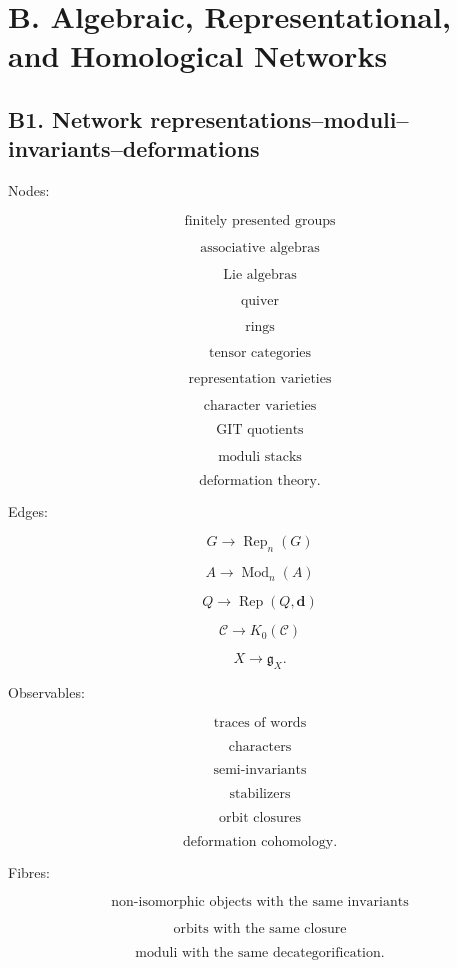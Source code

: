 \documentclass[11pt]{article}
\begin{document}
\section{B. Algebraic, Representational, and Homological Networks}



\subsection{B1. Network representations--moduli--invariants--deformations}

Nodes:

\[
\text{finitely presented groups}
\]

\[
\text{associative algebras}
\]

\[
\text{Lie algebras}
\]

\[
\text{quiver}
\]

\[
\text{rings}
\]

\[
\text{tensor categories}
\]

\[
\text{representation varieties}
\]

\[
\text{character varieties}
\]

\[
\text{GIT quotients}
\]

\[
\text{moduli stacks}
\]

\[
\text{deformation theory}.
\]

Edges:

\[
G\to \operatorname{Rep}_n(G)
\]

\[
A\to \operatorname{Mod}_n(A)
\]

\[
Q\to \operatorname{Rep}(Q,\mathbf d)
\]

\[
\mathcal C\to K_0(\mathcal C)
\]

\[
X\to \mathfrak g_X.
\]

Observables:

\[
\text{traces of words}
\]

\[
\text{characters}
\]

\[
\text{semi-invariants}
\]

\[
\text{stabilizers}
\]

\[
\text{orbit closures}
\]

\[
\text{deformation cohomology}.
\]

Fibres:

\[
\text{non-isomorphic objects with the same invariants}
\]

\[
\text{orbits with the same closure}
\]

\[
\text{moduli with the same decategorification}.
\]
\end{document}
